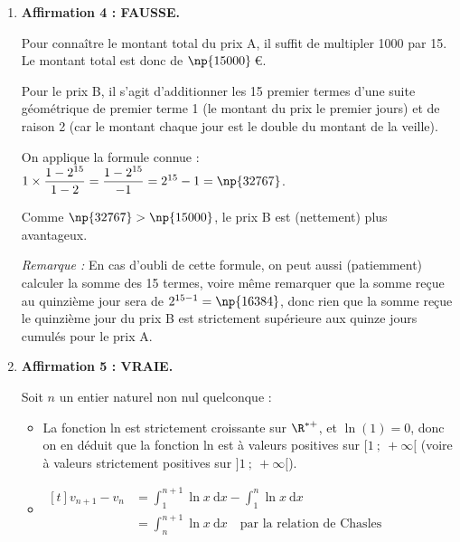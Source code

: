 \begin{enumerate}
	\begin{itemize}
		\item La première exécution \og modifie\fg{} \texttt{U} en \texttt{U + 0}, la valeur reste égale à 1;
		\item La deuxième exécution modifie \texttt{U} en \texttt{U + 1}, la valeur devient égale à $1 + 1 = 2$;
		\item La troisième exécution modifie \texttt{U} en \texttt{U + 2}, la valeur devient égale à $2 + 2 = 4$;
		\item La dernière exécution modifie \texttt{U} en \texttt{U + 3}, la valeur devient égale à $4 + 3 = 7$.
	\end{itemize}

	On a donc bien la valeur 7 renvoyée par cet appel.
	\item \textbf{Affirmation 4 : FAUSSE.}

	Pour connaître le montant total du prix A, il suffit de multipler 1000 par 15. Le montant total est donc de $\np{15000}$\,\euro{}.

	Pour le prix B, il s'agit d'additionner les 15 premier termes d'une suite géométrique de premier terme 1 (le montant du prix le premier jours) et de raison 2 (car le montant chaque jour est le double du montant de la veille).

	On applique la formule connue : \quad $1 \times \dfrac{1 - 2^{15}}{1 - 2} =\dfrac{1-2^{15}}{-1} = 2^{15} - 1 = \np{32767}$.

	Comme $\np{32767} > \np{15000}$, le prix B est (nettement) plus avantageux.

	\emph{Remarque :} En cas d'oubli de cette formule, on peut aussi (patiemment) calculer la somme des 15 termes, voire même remarquer que la somme reçue au quinzième jour sera de $2^{15 - 1} = \np{16384}$, donc rien que la somme reçue le quinzième jour du prix B est strictement supérieure aux quinze jours cumulés pour le prix A.

	\item \textbf{Affirmation 5 : VRAIE.}

	Soit $n$ un entier naturel non nul quelconque :

	\begin{itemize}
		\item La fonction ln est strictement croissante sur $\R^{*+}$, et $\ln(1) = 0$, donc on en déduit que la fonction ln est à valeurs positives sur $[1 ~;~ +\infty[$ (voire à valeurs strictement positives sur $]1~;~ +\infty[$).
		\item $\begin{aligned}[t] \displaystyle v_{n+1}	- v_n &= \int_{1}^{n+1} \ln x \:\mathrm{d} x - \int_{1}^{n} \ln x \:\mathrm{d} x \\
		&= \int_{n}^{n+1} \ln x \:\mathrm{d} x \quad\text{par la relation de Chasles} \end{aligned}$


\end{itemize}
\end{enumerate}
